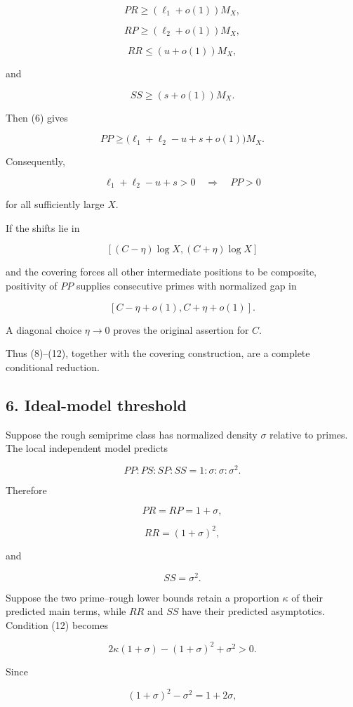 \[
PR\ge(\ell_1+o(1))M_X,
\tag{8}
\]

\[
RP\ge(\ell_2+o(1))M_X,
\tag{9}
\]

\[
RR\le(u+o(1))M_X,
\tag{10}
\]

and

\[
SS\ge(s+o(1))M_X.
\tag{11}
\]

Then (6) gives

\[
PP
\ge
\bigl(\ell_1+\ell_2-u+s+o(1)\bigr)M_X.
\]

Consequently,

\[
\boxed{
\ell_1+\ell_2-u+s>0
\quad\Longrightarrow\quad
PP>0
}
\tag{12}
\]

for all sufficiently large \(X\).

If the shifts lie in

\[
[(C-\eta)\log X,(C+\eta)\log X]
\]

and the covering forces all other intermediate positions to be composite, positivity of \(PP\) supplies consecutive primes with normalized gap in

\[
[C-\eta+o(1),C+\eta+o(1)].
\]

A diagonal choice \(\eta\to0\) proves the original assertion for \(C\).

Thus (8)--(12), together with the covering construction, are a complete conditional reduction.

\subsection*{6. Ideal-model threshold}

Suppose the rough semiprime class has normalized density \(\sigma\) relative to primes. The local independent model predicts

\[
PP:PS:SP:SS
=
1:\sigma:\sigma:\sigma^2.
\]

Therefore

\[
PR=RP=1+\sigma,
\]

\[
RR=(1+\sigma)^2,
\]

and

\[
SS=\sigma^2.
\]

Suppose the two prime--rough lower bounds retain a proportion \(\kappa\) of their predicted main terms, while \(RR\) and \(SS\) have their predicted asymptotics. Condition (12) becomes

\[
2\kappa(1+\sigma)
-(1+\sigma)^2
+\sigma^2
>0.
\]

Since

\[
(1+\sigma)^2-\sigma^2=1+2\sigma,
\]

